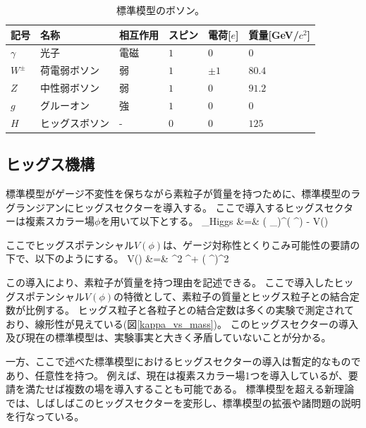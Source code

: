 \begin{table}[tbp]
\begin{center}
\caption[標準模型のボソン]{標準模型のボソン。}
\label{SM_particle_boson}
  \small
  \begin{tabular}{|llllll|} \hline
    記号      & 名称           & 相互作用 & スピン    & 電荷[$e$] & 質量[GeV/$c^2$] \\ \hline
    $\gamma$  & 光子           & 電磁     & $1$       & $0$       & $0$             \\
    $W^{\pm}$ & 荷電弱ボソン   & 弱       & $1$       & $\pm 1$   & $80.4$          \\
    $Z$       & 中性弱ボソン   & 弱       & $1$       & $0$       & $91.2$          \\
    $g$       & グルーオン     & 強       & $1$       & $0$       & $0$             \\ \hline
    $H$       & ヒッグスボソン & -        & $0$       & $0$       & $125$           \\ \hline
  \end{tabular}
\end{center}
\end{table}

\subsection{ヒッグス機構}
標準模型がゲージ不変性を保ちながら素粒子が質量を持つために、標準模型のラグランジアンにヒッグスセクターを導入する。
ここで導入するヒッグスセクターは複素スカラー場$\phi$を用いて以下とする。
\bbb
\label{higgs_sector}
_{\rm Higgs} &=&  \left( \partial_\mu \phi \right)^\dag \left( \partial^\mu \phi \right) - V(\phi) \\
\eee

ここでヒッグスポテンシャル$V(\phi)$は、ゲージ対称性とくりこみ可能性の要請の下で、以下のようにする。
\bbb
V(\phi)  &=& \mu^2 \phi^\dag \phi + \lambda \left( \phi^\dag \phi \right)^2
\eee

この導入により、素粒子が質量を持つ理由を記述できる。
ここで導入したヒッグスポテンシャル$V(\phi)$の特徴として、素粒子の質量とヒッグス粒子との結合定数が比例する。
ヒッグス粒子と各粒子との結合定数は多くの実験で測定されており、線形性が見えている(図\ref{kappa_vs_mass})。
このヒッグスセクターの導入及び現在の標準模型は、実験事実と大きく矛盾していないことが分かる。

一方、ここで述べた標準模型におけるヒッグスセクターの導入は暫定的なものであり、任意性を持つ。
例えば、現在は複素スカラー場1つを導入しているが、要請を満たせば複数の場を導入することも可能である。
標準模型を超える新理論では、しばしばこのヒッグスセクターを変形し、標準模型の拡張や諸問題の説明を行なっている。

